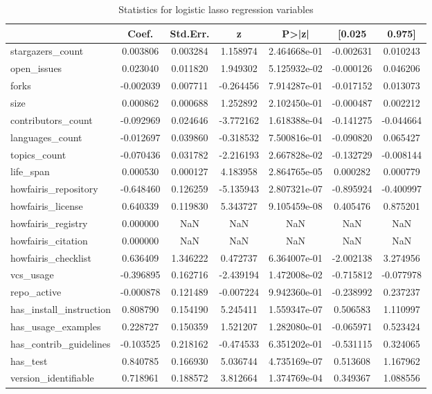 \begin{table}
\centering
\caption{Statistics for logistic lasso regression variables}
\label{tab:stats_logit_vars}
\begin{tabular}{lcccccc}
\toprule
{} &     Coef. &  Std.Err. &         z &         P>|z| &    [0.025 &    0.975] \\
\midrule
stargazers\_count        &  0.003806 &  0.003284 &  1.158974 &  2.464668e-01 & -0.002631 &  0.010243 \\
open\_issues             &  0.023040 &  0.011820 &  1.949302 &  5.125932e-02 & -0.000126 &  0.046206 \\
forks                   & -0.002039 &  0.007711 & -0.264456 &  7.914287e-01 & -0.017152 &  0.013073 \\
size                    &  0.000862 &  0.000688 &  1.252892 &  2.102450e-01 & -0.000487 &  0.002212 \\
contributors\_count      & -0.092969 &  0.024646 & -3.772162 &  1.618388e-04 & -0.141275 & -0.044664 \\
languages\_count         & -0.012697 &  0.039860 & -0.318532 &  7.500816e-01 & -0.090820 &  0.065427 \\
topics\_count            & -0.070436 &  0.031782 & -2.216193 &  2.667828e-02 & -0.132729 & -0.008144 \\
life\_span               &  0.000530 &  0.000127 &  4.183958 &  2.864765e-05 &  0.000282 &  0.000779 \\
howfairis\_repository    & -0.648460 &  0.126259 & -5.135943 &  2.807321e-07 & -0.895924 & -0.400997 \\
howfairis\_license       &  0.640339 &  0.119830 &  5.343727 &  9.105459e-08 &  0.405476 &  0.875201 \\
howfairis\_registry      &  0.000000 &       NaN &       NaN &           NaN &       NaN &       NaN \\
howfairis\_citation      &  0.000000 &       NaN &       NaN &           NaN &       NaN &       NaN \\
howfairis\_checklist     &  0.636409 &  1.346222 &  0.472737 &  6.364007e-01 & -2.002138 &  3.274956 \\
vcs\_usage               & -0.396895 &  0.162716 & -2.439194 &  1.472008e-02 & -0.715812 & -0.077978 \\
repo\_active             & -0.000878 &  0.121489 & -0.007224 &  9.942360e-01 & -0.238992 &  0.237237 \\
has\_install\_instruction &  0.808790 &  0.154190 &  5.245411 &  1.559347e-07 &  0.506583 &  1.110997 \\
has\_usage\_examples      &  0.228727 &  0.150359 &  1.521207 &  1.282080e-01 & -0.065971 &  0.523424 \\
has\_contrib\_guidelines  & -0.103525 &  0.218162 & -0.474533 &  6.351202e-01 & -0.531115 &  0.324065 \\
has\_test                &  0.840785 &  0.166930 &  5.036744 &  4.735169e-07 &  0.513608 &  1.167962 \\
version\_identifiable    &  0.718961 &  0.188572 &  3.812664 &  1.374769e-04 &  0.349367 &  1.088556 \\
\bottomrule
\end{tabular}
\end{table}
